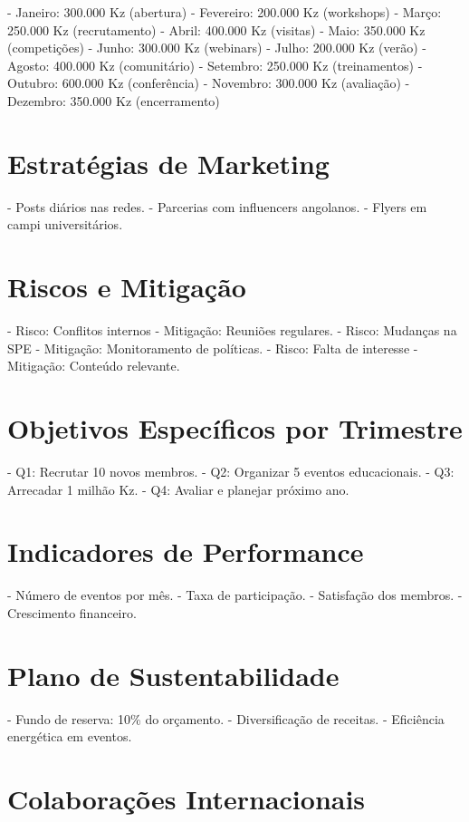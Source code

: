 \documentclass[12pt]{article}
\begin{document}
- Janeiro: 300.000 Kz (abertura)
- Fevereiro: 200.000 Kz (workshops)
- Março: 250.000 Kz (recrutamento)
- Abril: 400.000 Kz (visitas)
- Maio: 350.000 Kz (competições)
- Junho: 300.000 Kz (webinars)
- Julho: 200.000 Kz (verão)
- Agosto: 400.000 Kz (comunitário)
- Setembro: 250.000 Kz (treinamentos)
- Outubro: 600.000 Kz (conferência)
- Novembro: 300.000 Kz (avaliação)
- Dezembro: 350.000 Kz (encerramento)

\section{Estratégias de Marketing}

- Posts diários nas redes.
- Parcerias com influencers angolanos.
- Flyers em campi universitários.

\section{Riscos e Mitigação}

- Risco: Conflitos internos - Mitigação: Reuniões regulares.
- Risco: Mudanças na SPE - Mitigação: Monitoramento de políticas.
- Risco: Falta de interesse - Mitigação: Conteúdo relevante.

\section{Objetivos Específicos por Trimestre}

- Q1: Recrutar 10 novos membros.
- Q2: Organizar 5 eventos educacionais.
- Q3: Arrecadar 1 milhão Kz.
- Q4: Avaliar e planejar próximo ano.

\section{Indicadores de Performance}

- Número de eventos por mês.
- Taxa de participação.
- Satisfação dos membros.
- Crescimento financeiro.

\section{Plano de Sustentabilidade}

- Fundo de reserva: 10\% do orçamento.
- Diversificação de receitas.
- Eficiência energética em eventos.

\section{Colaborações Internacionais}
\end{document}
